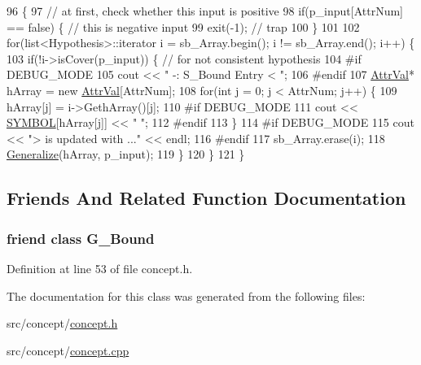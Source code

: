\begin{DoxyCode}
96                                        \{
97     \textcolor{comment}{// at first, check whether this input is positive}
98     \textcolor{keywordflow}{if}(p\_input[AttrNum] == \textcolor{keyword}{false}) \{ \textcolor{comment}{// this is negative input}
99     exit(-1);           \textcolor{comment}{// trap}
100     \}
101     
102     \textcolor{keywordflow}{for}(list<Hypothesis>::iterator i = sb\_Array.begin(); i != sb\_Array.end(); i++) \{
103     \textcolor{keywordflow}{if}(!i->isCover(p\_input)) \{  \textcolor{comment}{// for not consistent hypothesis}
104 \textcolor{preprocessor}{#if DEBUG\_MODE}
105 \textcolor{preprocessor}{}        cout << \textcolor{stringliteral}{" -: S\_Bound Entry < "};
106 \textcolor{preprocessor}{#endif}
107 \textcolor{preprocessor}{}        \hyperlink{concept_8h_a9680d29b8d997e4adbf99481b65e897d}{AttrVal}* hArray = \textcolor{keyword}{new} \hyperlink{concept_8h_a9680d29b8d997e4adbf99481b65e897d}{AttrVal}[AttrNum];
108         \textcolor{keywordflow}{for}(\textcolor{keywordtype}{int} j = 0; j < AttrNum; j++) \{
109         hArray[j] = i->GethArray()[j];
110 \textcolor{preprocessor}{#if DEBUG\_MODE}
111 \textcolor{preprocessor}{}        cout << \hyperlink{concept_8cpp_a6a0fcd5aed2dc21ce5f79cbe7c3a8e2f}{SYMBOL}[hArray[j]] << \textcolor{stringliteral}{" "};
112 \textcolor{preprocessor}{#endif      }
113 \textcolor{preprocessor}{}        \}
114 \textcolor{preprocessor}{#if DEBUG\_MODE}
115 \textcolor{preprocessor}{}        cout << \textcolor{stringliteral}{"> is updated with ..."} << endl;
116 \textcolor{preprocessor}{#endif}
117 \textcolor{preprocessor}{}        sb\_Array.erase(i);
118         \hyperlink{class_s___bound_ae266bf5fa4d70959ce3b33ebe2d13dfa}{Generalize}(hArray, p\_input);
119     \}
120     \}
121 \}
\end{DoxyCode}


\subsection{Friends And Related Function Documentation}
\hypertarget{class_s___bound_ada6e422609483cdffa32ad88125d9f0d}{
\subsubsection[{G\-\_\-\-Bound}]{\setlength{\rightskip}{0pt plus 5cm}friend class {\bf G\-\_\-\-Bound}\hspace{0.3cm}{\ttfamily [friend]}}}\label{class_s___bound_ada6e422609483cdffa32ad88125d9f0d}


Definition at line 53 of file concept.\-h.



The documentation for this class was generated from the following files\-:\begin{DoxyCompactItemize}
\item 
src/concept/\hyperlink{concept_8h}{concept.\-h}\item 
src/concept/\hyperlink{concept_8cpp}{concept.\-cpp}\end{DoxyCompactItemize}
